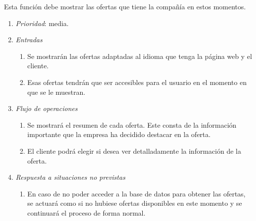  \label{fun:mostrarofertas}
	Esta función debe mostrar las ofertas que tiene la compañía en estos momentos.
	
\begin{enumerate}
	\item \textit{Prioridad}: media.
	\item \textit{Entradas}
	\begin{enumerate}
		\item Se mostrarán las ofertas adaptadas al idioma que tenga la página web y el cliente.
		\item Esas ofertas tendrán que ser accesibles para el usuario en el momento en que se le muestran.
	\end{enumerate}
	\item \textit{Flujo de operaciones}
	\begin{enumerate}
		\item Se mostrará el resumen de cada oferta. Este consta de la información importante que la empresa ha decidido destacar en la oferta. 
		\item El cliente podrá elegir si desea ver detalladamente la información de la oferta.
	\end{enumerate}
	\item \textit{Respuesta a situaciones no previstas}
	\begin{enumerate}
		\item En caso de no poder acceder a la base de datos para obtener las ofertas, se actuará como si no hubiese ofertas disponibles en este momento y se continuará el proceso de forma normal.
	\end{enumerate}
\end{enumerate}
